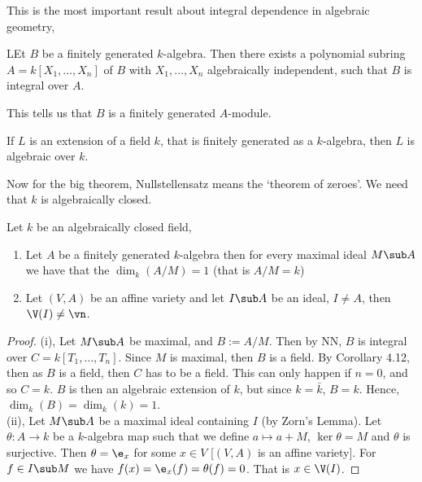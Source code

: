 \noindent
This is the most important result about integral dependence in algebraic geometry,
\begin{nprop}
  LEt $B$ be a finitely generated $k$-algebra. Then there exists a polynomial subring $A = k[X_1, \dots, X_n]$ of $B$ with $X_1, \dots, X_n$ algebraically independent, such that $B$ is integral over $A$.
\end{nprop}
\noindent
This tells us that $B$ is a finitely generated $A$-module.

\begin{ncor}
  If $L$ is an extension of a field $k$, that is finitely generated as a $k$-algebra, then $L$ is algebraic over $k$.
\end{ncor}

\noindent
Now for the big theorem, Nullstellensatz means the `theorem of zeroes'. We need that $k$ is algebraically closed.
\begin{nthm}
  Let $k$ be an algebraically closed field,
  \begin{enumerate}
    \item Let $A$ be a finitely generated $k$-algebra then for every maximal ideal $M\sub A$ we have that the $\dim_k (A / M) = 1$ (that is $A/M = k$)
    \item Let $(V, A)$ be an affine variety and let $I \sub A$ be an ideal, $I \ne A$, then $\V(I) \ne \vn$.
  \end{enumerate}
\end{nthm}
\begin{proof}
  (i), Let $M \sub A$ be maximal, and $B := A/M$. Then by NN, $B$ is integral over $C = k[T_1, \dots, T_n]$. Since $M$ is maximal, then $B$ is a field.  By Corollary 4.12, then as $B$ is a field, then $C$ has to be a field. This can only happen if $n = 0$, and so $C = k$. $B$ is then an algebraic extension of $k$, but since $k = \bar k$, $B = k$. Hence, $\dim_k (B) = \dim_k (k) = 1$.\\

  \noindent
  (ii), Let $M \sub A$ be a maximal ideal containing $I$ (by Zorn's Lemma). Let $\theta : A \to k$ be a $k$-algebra map such that we define $a \mapsto a + M$, $\ker \theta = M$ and $\theta$ is surjective. Then $\theta = \e_x$ for some $x \in V$ [$(V, A)$ is an affine variety]. For $f \in I \sub M$ we have $f(x) = \e_x (f) = \theta(f) = 0$. That is $x \in \V(I)$.
\end{proof}

